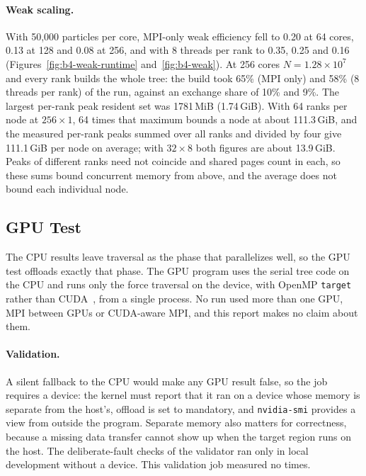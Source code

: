 \documentclass[10pt,a4paper,twocolumn,twoside]{rho-class/rho}
\begin{document}
\paragraph{Weak scaling.} With 50{,}000 particles per core, MPI-only weak efficiency fell to 0.20 at 64 cores, 0.13 at 128 and 0.08 at 256, and with 8 threads per rank to 0.35, 0.25 and 0.16 (Figures~\ref{fig:b4-weak-runtime} and~\ref{fig:b4-weak}). At 256 cores $N=1.28\times10^7$ and every rank builds the whole tree: the build took 65\% (MPI only) and 58\% (8 threads per rank) of the run, against an exchange share of 10\% and 9\%. The largest per-rank peak resident set was 1781\,MiB (1.74\,GiB). With 64 ranks per node at $256\times1$, 64 times that maximum bounds a node at about 111.3\,GiB, and the measured per-rank peaks summed over all ranks and divided by four give 111.1\,GiB per node on average; with $32\times8$ both figures are about 13.9\,GiB. Peaks of different ranks need not coincide and shared pages count in each, so these sums bound concurrent memory from above, and the average does not bound each individual node.

\subsection{GPU Test}
\label{sec:gpu}
The CPU results leave traversal as the phase that parallelizes well, so the GPU test offloads exactly that phase. The GPU program uses the serial tree code on the CPU and runs only the force traversal on the device, with OpenMP \texttt{target}~\cite{Lecture9} rather than CUDA~\cite{Lecture10}, from a single process. No run used more than one GPU, MPI between GPUs or CUDA-aware MPI, and this report makes no claim about them.

\paragraph{Validation.} A silent fallback to the CPU would make any GPU result false, so the job requires a device: the kernel must report that it ran on a device whose memory is separate from the host's, offload is set to mandatory, and \texttt{nvidia-smi} provides a view from outside the program. Separate memory also matters for correctness, because a missing data transfer cannot show up when the target region runs on the host.  The deliberate-fault checks of the validator ran only in local development without a device. This validation job measured no times.
\end{document}
